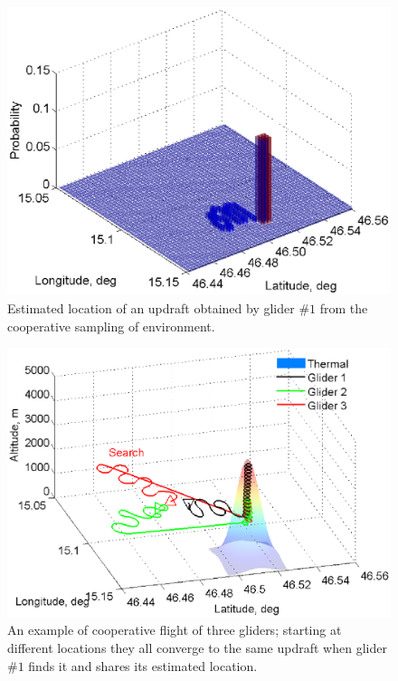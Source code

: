 \documentclass{ifacconf}
\begin{document}
\begin{figure}[thpb]
  \centering
  \includegraphics[scale=0.525]{Figures/Mapping_thermals.eps}
  \caption{Estimated location of an updraft obtained by glider $\#1$ from the cooperative sampling of environment.}
  \label{fig:SimPDF}
\end{figure}

\begin{figure}[thpb]
  \centering
  \includegraphics[scale=0.45]{Figures/paths_cooperative_flight.eps}
  \caption{An example of cooperative flight of three gliders; starting at different locations they all converge to the same updraft when glider $\#1$ finds it and shares its estimated location.}
  \label{fig:CoopFlightPaths}
\end{figure}
\end{document}

